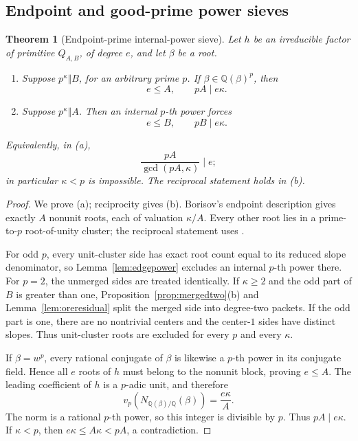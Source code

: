 \documentclass[11pt]{article}
\newtheorem{theorem}{Theorem}[section]
\theoremstyle{definition}
\newcommand{\Q}{\mathbb Q}
\begin{document}
\subsection{Endpoint and good-prime power sieves}

\begin{theorem}[Endpoint-prime internal-power sieve]
\label{thm:endpointpower}
Let \(h\) be an irreducible factor of primitive \(Q_{A,B}\), of degree
\(e\), and let \(\beta\) be a root.
\begin{enumerate}[label=(\alph*)]
\item Suppose \(p^\kappa\Vert B\), for an arbitrary prime \(p\).  If
\(\beta\in\Q(\beta)^p\), then
\begin{equation}
 e\leq A,\qquad pA\mid e\kappa.
 \tag{15.5}
\end{equation}
\item Suppose \(p^\kappa\Vert A\).  Then an internal \(p\)-th power
forces
\begin{equation}
 e\leq B,\qquad pB\mid e\kappa.
 \tag{15.6}
\end{equation}
\end{enumerate}
Equivalently, in (a),
\[
 \frac{pA}{\gcd(pA,\kappa)}\mid e;
\]
in particular \(\kappa<p\) is impossible.  The reciprocal statement holds
in (b).
\end{theorem}

\begin{proof}
We prove (a); reciprocity gives (b).  Borisov's endpoint description
\cite[Lemma~2.10]{Borisov1998} gives exactly \(A\) nonunit roots, each of
valuation \(\kappa/A\).  Every other root lies in a prime-to-\(p\)
root-of-unity cluster; the reciprocal statement uses
\cite[Lemma~2.11]{Borisov1998}.

For odd \(p\), every unit-cluster side has exact root count equal to its
reduced slope denominator, so Lemma~\ref{lem:edgepower} excludes an internal
\(p\)-th power there.  For \(p=2\), the unmerged sides are treated
identically.  If \(\kappa\geq2\) and the odd part of \(B\) is greater than
one, Proposition~\ref{prop:mergedtwo}(b) and
Lemma~\ref{lem:oreresidual} split the merged side into degree-two packets.
If the odd part is one, there are no nontrivial centers and the center-\(1\)
sides have distinct slopes.  Thus unit-cluster roots are excluded for every
\(p\) and every \(\kappa\).

If \(\beta=w^p\), every rational conjugate of \(\beta\) is likewise a
\(p\)-th power in its conjugate field.  Hence all \(e\) roots of \(h\) must
belong to the nonunit block, proving \(e\leq A\).  The leading coefficient
of \(h\) is a \(p\)-adic unit, and therefore
\[
 v_p\!\left(N_{\Q(\beta)/\Q}(\beta)\right)
 =\frac{e\kappa}{A}.
\]
The norm is a rational \(p\)-th power, so this integer is divisible by
\(p\).  Thus \(pA\mid e\kappa\).  If \(\kappa<p\), then
\(e\kappa\leq A\kappa<pA\), a contradiction.
\end{proof}
\end{document}
